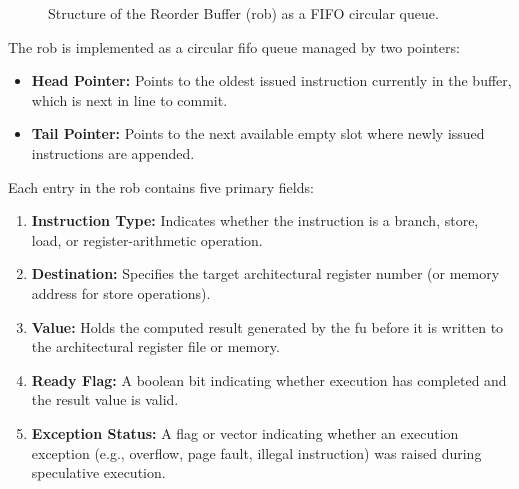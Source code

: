 \begin{figure}[htpb]
\centering
{}
\caption{Structure of the Reorder Buffer (\gls{rob}) as a FIFO circular queue.}
\label{fig:rob_circular_queue}
\end{figure}

The \gls{rob} is implemented as a circular \gls{fifo} queue managed by two pointers:
\begin{itemize}
    \item \textbf{Head Pointer:} Points to the oldest issued instruction currently in the buffer, which is next in line to commit.
    \item \textbf{Tail Pointer:} Points to the next available empty slot where newly issued instructions are appended.
\end{itemize}

Each entry in the \gls{rob} contains five primary fields:
\begin{enumerate}
    \item \textbf{Instruction Type:} Indicates whether the instruction is a branch, store, load, or register-arithmetic operation.
    \item \textbf{Destination:} Specifies the target architectural register number (or memory address for store operations).
    \item \textbf{Value:} Holds the computed result generated by the \gls{fu} before it is written to the architectural register file or memory.
    \item \textbf{Ready Flag:} A boolean bit indicating whether execution has completed and the result value is valid.
    \item \textbf{Exception Status:} A flag or vector indicating whether an execution exception (e.g., overflow, page fault, illegal instruction) was raised during speculative execution.
\end{enumerate}

